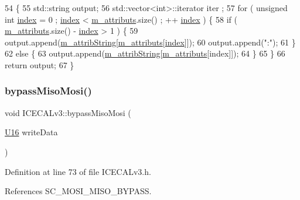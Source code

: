 \begin{DoxyCode}
54                             \{
55   std::string output;
56   std::vector<int>::iterator iter ;
57   \textcolor{keywordflow}{for} ( \textcolor{keywordtype}{unsigned} \textcolor{keywordtype}{int} \hyperlink{namespaceimages_a54407fd574970b3178647ae096321a57}{index} = 0 ; \hyperlink{namespaceimages_a54407fd574970b3178647ae096321a57}{index} < \hyperlink{classAttrib_ac4bd58a0cc6b38a3b711d609a3d3aacc}{m\_attributs}.size() ; ++
      \hyperlink{namespaceimages_a54407fd574970b3178647ae096321a57}{index} ) \{
58     \textcolor{keywordflow}{if} ( \hyperlink{classAttrib_ac4bd58a0cc6b38a3b711d609a3d3aacc}{m\_attributs}.size() - \hyperlink{namespaceimages_a54407fd574970b3178647ae096321a57}{index} > 1 ) \{
59       output.append(\hyperlink{classAttrib_a3414521d7a82476e874b25a5407b5e63}{m\_attribString}[\hyperlink{classAttrib_ac4bd58a0cc6b38a3b711d609a3d3aacc}{m\_attributs}[\hyperlink{namespaceimages_a54407fd574970b3178647ae096321a57}{index}]]);
60       output.append(\textcolor{stringliteral}{":"});
61     \}
62     \textcolor{keywordflow}{else} \{
63       output.append(\hyperlink{classAttrib_a3414521d7a82476e874b25a5407b5e63}{m\_attribString}[\hyperlink{classAttrib_ac4bd58a0cc6b38a3b711d609a3d3aacc}{m\_attributs}[index]]);
64     \}
65   \}
66   \textcolor{keywordflow}{return} output;
67 \}
\end{DoxyCode}
\mbox{\label{classICECALv3_a5ce36881aa89fedf7c37e03620acca6e}} 
\subsubsection{\texorpdfstring{bypass\+Miso\+Mosi()}{bypassMisoMosi()}}
{\footnotesize\ttfamily void I\+C\+E\+C\+A\+Lv3\+::bypass\+Miso\+Mosi (\begin{DoxyParamCaption}\item[{\hyperlink{ICECALv3_8h_adf928e51a60dba0df29d615401cc55a8}{U16}}]{write\+Data }\end{DoxyParamCaption})\hspace{0.3cm}{\ttfamily [inline]}}



Definition at line 73 of file I\+C\+E\+C\+A\+Lv3.\+h.



References S\+C\+\_\+\+M\+O\+S\+I\+\_\+\+M\+I\+S\+O\+\_\+\+B\+Y\+P\+A\+SS.


